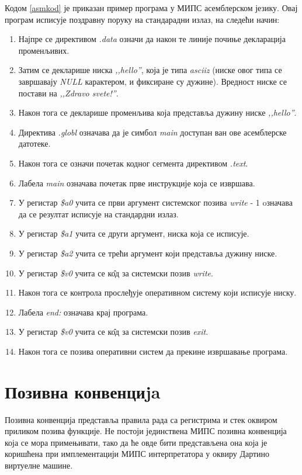 \documentclass[12pt,oneside]{memoir}
\begin{document}
Кодом \ref{asmkod} је приказан пример програма у МИПС асемблерском језику. Овај програм исписује поздравну поруку на стандарадни излаз, на следећи начин:
\begin{enumerate}
\item Најпре се директивом \textit{.data} означи да након те линије почиње декларација променљивих.
\item Затим се декларише ниска \textit{,,hello''}, која је типа \textit{asciiz} (ниске овог типа се завршавају \textit{NULL} карактером, и фиксиране су дужине). Вредност ниске се постави на \textit{,,Zdravo svete!''}.
\item Након тога се декларише променљива која представља дужину ниске \textit{,,hello''}.
\item Директива \textit{.globl} означава да је симбол \textit{main} доступан ван ове асемблерске датотеке.
\item Након тога се означи почетак кодног сегмента директивом \textit{.text}.
\item Лабела \textit{main} означава почетак прве инструкције која се извршава.
\item У регистар \textit{\$a0} учита се први аргумент системског позива \textit{write} - 1 oзначава да се резултат исписује на стандардни излаз.
\item У регистар \textit{\$a1} учита се други аргумент, ниска која се исписује.
\item У регистар \textit{\$a2} учита се трећи аргумент који представља дужину ниске.
\item У регистар \textit{\$v0} учита се к\^{о}д за системски позив \textit{write}.
\item Након тога се контрола прослеђује оперативном систему који исписује ниску.
\item Лабела \textit{ end:} означава крај програма.
\item У регистар \textit{\$v0} учита се к\^{о}д за системски позив \textit{exit}.
\item Након тога се позива оперативни систем да прекине извршавање програма.
\end{enumerate}


\section{Позивна конвенциja}
\label{konvencija}

Позивна конвенција представља правила рада са регистрима и стек оквиром приликом позива функције. Не постоји јединствена МИПС позивна конвенција која се мора примењивати, тако да ће овде бити представљена она која је коришћена при имплементацији МИПС интерпретатора у оквиру Дартино виртуелне машине.
\end{document}
